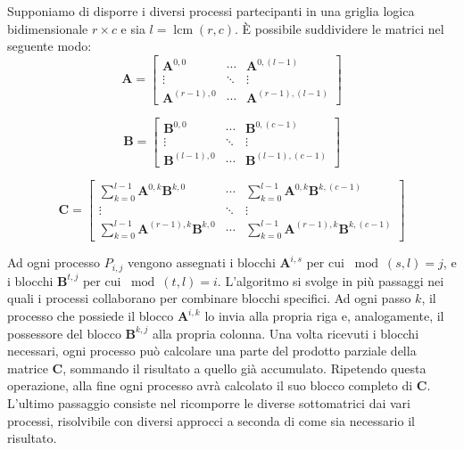 \documentclass[a4paper]{article}
\DeclareMathOperator{\lcm}{lcm}
\begin{document}
Supponiamo di disporre i diversi processi partecipanti in una griglia logica bidimensionale $r \times c$ e sia $l=\lcm(r, c)$. È possibile suddividere le matrici nel seguente modo:
$$
    \mathbf{A}=
    \begin{bmatrix}
        \mathbf{A}^{0,0}     & \cdots & \mathbf{A}^{0,(l-1)}     \\
        \vdots               & \ddots & \vdots                   \\
        \mathbf{A}^{(r-1),0} & \cdots & \mathbf{A}^{(r-1),(l-1)}
    \end{bmatrix}
$$

$$
    \mathbf{B}=
    \begin{bmatrix}
        \mathbf{B}^{0,0}     & \cdots & \mathbf{B}^{0,(c-1)}     \\
        \vdots               & \ddots & \vdots                   \\
        \mathbf{B}^{(l-1),0} & \cdots & \mathbf{B}^{(l-1),(c-1)}
    \end{bmatrix}
$$

$$
    \mathbf{C}=
    \begin{bmatrix}
        \sum_{k=0}^{l-1}\mathbf{A}^{0,k}\mathbf{B}^{k,0}     & \cdots & \sum_{k=0}^{l-1}\mathbf{A}^{0,k}\mathbf{B}^{k,(c-1)}     \\
        \vdots                                               & \ddots & \vdots                                                   \\
        \sum_{k=0}^{l-1}\mathbf{A}^{(r-1),k}\mathbf{B}^{k,0} & \cdots & \sum_{k=0}^{l-1}\mathbf{A}^{(r-1),k}\mathbf{B}^{k,(c-1)}
    \end{bmatrix}
$$

Ad ogni processo $P_{i,j}$ vengono assegnati i blocchi $\mathbf{A}^{i,s}$ per cui $\bmod(s,l)=j$, e i blocchi $\mathbf{B}^{t,j}$ per cui $\bmod(t,l)=i$.
L'algoritmo si svolge in più passaggi nei quali i processi collaborano per combinare blocchi specifici. Ad ogni passo $k$, il processo che possiede il blocco $\mathbf{A}^{i,k}$ lo invia alla propria riga e, analogamente, il possessore del blocco $\mathbf{B}^{k,j}$ alla propria colonna.
Una volta ricevuti i blocchi necessari, ogni processo può calcolare una parte del prodotto parziale della matrice $\mathbf{C}$, sommando il risultato a quello già accumulato. Ripetendo questa operazione, alla fine ogni processo avrà calcolato il suo blocco completo di $\mathbf{C}$. L'ultimo passaggio consiste nel ricomporre le diverse sottomatrici dai vari processi, risolvibile con diversi approcci a seconda di come sia necessario il risultato.
\end{document}
